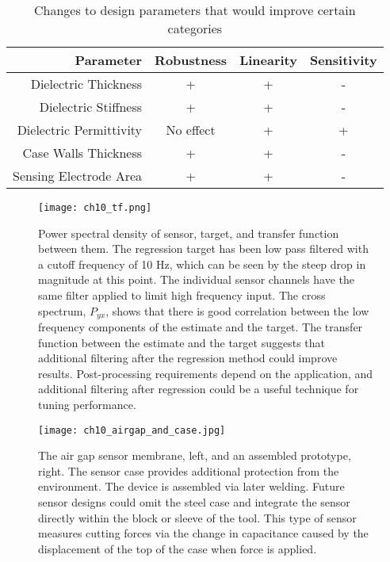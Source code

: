 \begin{table}[]
\centering
\caption{Changes to design parameters that would improve certain categories}
\label{tab:improve}
\begin{tabular}{|r|c|c|c|}
\hline
Parameter               & Robustness   & Linearity    & Sensitivity               \\ \hline
Dielectric Thickness    & +            & +            & -   \\ \hline
Dielectric Stiffness    & +            & +            & -   \\ \hline
Dielectric Permittivity & No effect    & +            & +   \\ \hline
Case Walls Thickness    & +            & +            & -   \\ \hline
Sensing Electrode Area  & +            & +            & -   \\ \hline
\end{tabular}
\end{table}

\begin{figure}[ht]
\centering
\texttt{[image: ch10\_tf.png]}
\caption{
Power spectral density of sensor, target, and transfer function between them.
The regression target has been low pass filtered with a cutoff frequency of 10 Hz,
which can be seen by the steep drop in magnitude at this point.
The individual sensor channels have the same filter applied to limit high frequency input.
The cross spectrum, $P_{yx}$, shows that there is good correlation between the low frequency
components of the estimate and the target.
The transfer function between the estimate and the target suggests that additional 
filtering after the regression method could improve results.
Post-processing requirements depend on the application, and 
additional filtering after regression could be a useful technique for tuning performance.
}
\label{fig:sense_tf}
\end{figure}

\begin{figure}[ht]
\centering
\texttt{[image: ch10\_airgap\_and\_case.jpg]}
\caption{
The air gap sensor membrane, left, and an assembled prototype, right.
The sensor case provides additional protection from the environment.
The device is assembled via later welding.
Future sensor designs could omit the steel case and integrate the sensor directly within
the block or sleeve of the tool.
This type of sensor measures cutting forces via the change in capacitance caused
by the displacement of the top of the case when force is applied. 
}
\label{fig:airgap}
\end{figure}


